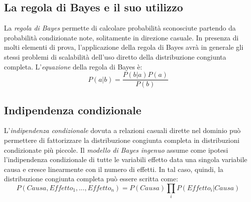 \documentclass[11pt,oneside]{book}
\begin{document}
\subsection{La regola di Bayes e il suo utilizzo}
La \textit{regola di Bayes} permette di calcolare probabilità sconosciute partendo da probabilità condizionate note, solitamente in direzione casuale. In presenza di molti elementi di prova, l'applicazione della regola di Bayes avrà in generale gli stessi problemi di scalabilità dell'uso diretto della distribuzione congiunta completa. L'\textit{equazione} della regola di Bayes è:
\[ P(a|b) = \frac{P(b|a)P(a)}{P(b)} \]

\subsection{Indipendenza condizionale}
L'\textit{indipendenza condizionale} dovuta a relazioni casuali dirette nel dominio può permettere di fattorizzare la distribuzione congiunta completa in distribuzioni condizionate più piccole. Il \textit{modello di Bayes ingenuo} assume come ipotesi l'indipendenza condizionale di tutte le variabili effetto data una singola variabile causa e cresce linearmente con il numero di effetti. In tal caso, quindi, la distribuzione congiunta completa può essere scritta come:
\[ P(Causa, Effetto_1, ..., Effetto_n) = P(Causa) \prod_i P(Effetto_i|Causa) \]
\end{document}
